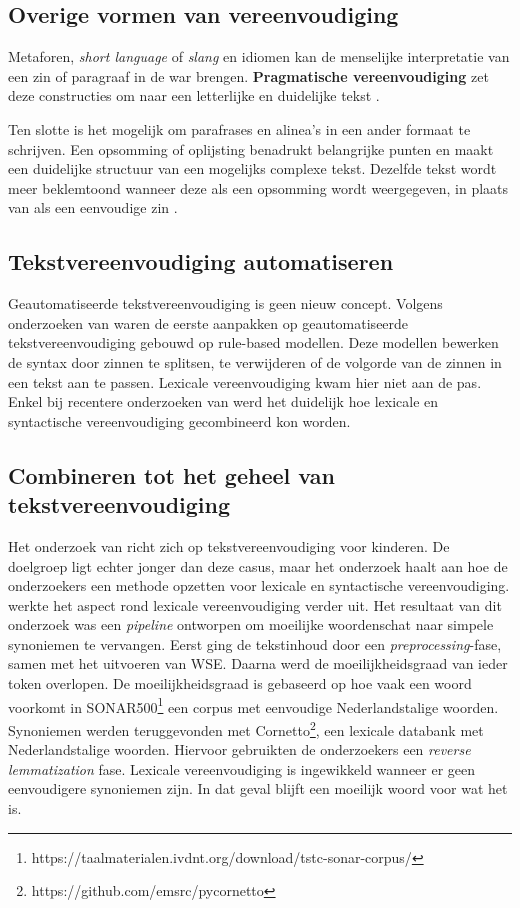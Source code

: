 \subsection{Overige vormen van vereenvoudiging}

Metaforen, \textit{short language} of \textit{slang} en idiomen kan de menselijke interpretatie van een zin of paragraaf in de war brengen. \textbf{Pragmatische vereenvoudiging} zet deze constructies om naar een letterlijke en duidelijke tekst \autocite{JavoureyDrevet2022}.

Ten slotte is het mogelijk om parafrases en alinea's in een ander formaat te schrijven. Een opsomming of oplijsting benadrukt belangrijke punten en maakt een duidelijke structuur van een mogelijks complexe tekst. Dezelfde tekst wordt meer beklemtoond wanneer deze als een opsomming wordt weergegeven, in plaats van als een eenvoudige zin \autocite{Siddharthan2014, Hale2022}. 

\subsection{Tekstvereenvoudiging automatiseren}

Geautomatiseerde tekstvereenvoudiging is geen nieuw concept. Volgens onderzoeken van \textcite{Canning2000, Siddharthan2006} waren de eerste aanpakken op geautomatiseerde tekstvereenvoudiging gebouwd op rule-based modellen. Deze modellen bewerken de syntax door zinnen te splitsen, te verwijderen of de volgorde van de zinnen in een tekst aan te passen. Lexicale vereenvoudiging kwam hier niet aan de pas. Enkel bij recentere onderzoeken van \textcite{Coster2011, Bulte2018} werd het duidelijk hoe lexicale en syntactische vereenvoudiging gecombineerd kon worden.

\subsection{Combineren tot het geheel van tekstvereenvoudiging}

Het onderzoek van \textcite{DeBelder2010} richt zich op tekstvereenvoudiging voor kinderen. De doelgroep ligt echter jonger dan deze casus, maar het onderzoek haalt aan hoe de onderzoekers een methode opzetten voor lexicale en syntactische vereenvoudiging. \textcite{Bulte2018} werkte het aspect rond lexicale vereenvoudiging verder uit. Het resultaat van dit onderzoek was een \textit{pipeline} ontworpen om moeilijke woordenschat naar simpele synoniemen te vervangen. Eerst ging de tekstinhoud door een \textit{preprocessing}-fase, samen met het uitvoeren van WSE. Daarna werd de moeilijkheidsgraad van ieder token overlopen. De moeilijkheidsgraad is gebaseerd op hoe vaak een woord voorkomt in SONAR500\footnote{https://taalmaterialen.ivdnt.org/download/tstc-sonar-corpus/} een corpus met eenvoudige Nederlandstalige woorden. Synoniemen werden teruggevonden met Cornetto\footnote{https://github.com/emsrc/pycornetto}, een lexicale databank met Nederlandstalige woorden. Hiervoor gebruikten de onderzoekers een \textit{reverse lemmatization} fase. Lexicale vereenvoudiging is ingewikkeld wanneer er geen eenvoudigere synoniemen zijn. In dat geval blijft een moeilijk woord voor wat het is.

